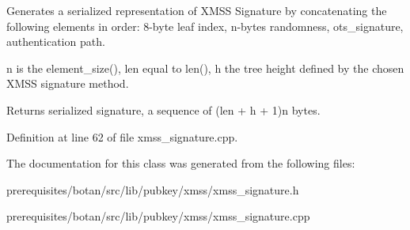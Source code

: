 Generates a serialized representation of X\+M\+SS Signature by concatenating the following elements in order\+: 8-\/byte leaf index, n-\/bytes randomness, ots\+\_\+signature, authentication path.

n is the element\+\_\+size(), len equal to len(), h the tree height defined by the chosen X\+M\+SS signature method.

\begin{DoxyReturn}{Returns}
serialized signature, a sequence of (len + h + 1)n bytes. 
\end{DoxyReturn}


Definition at line 62 of file xmss\+\_\+signature.\+cpp.



The documentation for this class was generated from the following files\+:\begin{DoxyCompactItemize}
\item 
prerequisites/botan/src/lib/pubkey/xmss/xmss\+\_\+signature.\+h\item 
prerequisites/botan/src/lib/pubkey/xmss/xmss\+\_\+signature.\+cpp\end{DoxyCompactItemize}
